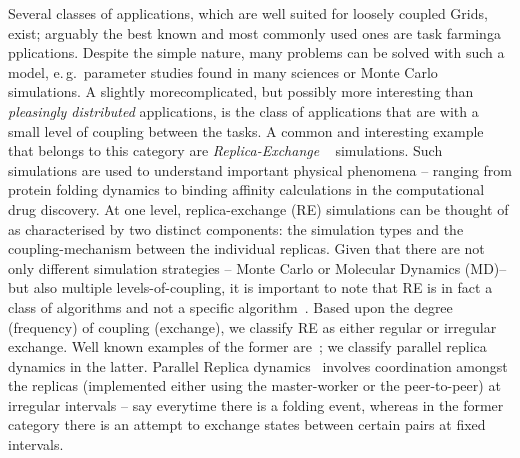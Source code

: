 \documentclass[times, 10pt, twocolumn]{article}
\begin{document}
\begin{abstract}
\end{abstract}

                           
Several classes of applications, which are well suited for loosely
coupled Grids, exist; arguably the best known and most commonly used
ones are task farminga pplications. Despite the simple nature, many
problems can be solved with such a model, e.\,g.\ parameter studies
found in many sciences or Monte Carlo simulations. A slightly
morecomplicated, but possibly more interesting than {\it pleasingly
  distributed} applications, is the class of applications that are
with a small level of coupling between the tasks.  
A common and interesting example that belongs to this category are
\emph{Replica-Exchange }~\cite{hansmann,Sugita:1999rm} simulations.
Such simulations are used to understand important physical phenomena
-- ranging from protein folding dynamics to binding affinity
calculations in the computational drug discovery.  At one level,
replica-exchange (RE) simulations can be thought of as characterised
by two distinct components: the simulation types and the
coupling-mechanism between the individual replicas. Given that there
are not only different simulation strategies -- Monte Carlo or
Molecular Dynamics (MD)-- but also multiple levels-of-coupling, it is
important to note that RE is in fact a class of algorithms and not a
specific algorithm~\cite{dpa_surveypaper}.  Based upon the degree
(frequency) of coupling (exchange), we classify RE as either regular
or irregular exchange. Well known examples of the former
are~\cite{hansmann,Sugita:1999rm}; we classify parallel replica
dynamics in the latter. Parallel Replica dynamics~\cite{SPdynamics,
  pande_bj03} involves coordination amongst the replicas (implemented
either using the master-worker or the peer-to-peer) at irregular
intervals -- say everytime there is a folding event, whereas in the
former category there is an attempt to exchange states between certain
pairs at fixed intervals.

\end{document}

